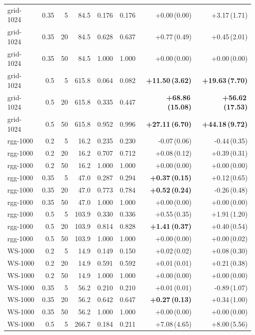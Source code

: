 \documentclass[11pt]{article}
\theoremstyle{definition}
\theoremstyle{remark}
\begin{document}
\begin{table}[h]
\begin{tabular}{lrrrrrrr}
grid-1024 & 0.35 & 5 & 84.5 & 0.176 & 0.176 & +0.00\,(0.00) & +3.17\,(1.71) \\
grid-1024 & 0.35 & 20 & 84.5 & 0.628 & 0.637 & +0.77\,(0.49) & +0.45\,(2.01) \\
grid-1024 & 0.35 & 50 & 84.5 & 1.000 & 1.000 & +0.00\,(0.00) & +0.00\,(0.00) \\
grid-1024 & 0.5 & 5 & 615.8 & 0.064 & 0.082 & \textbf{+11.50\,(3.62)} & \textbf{+19.63\,(7.70)} \\
grid-1024 & 0.5 & 20 & 615.8 & 0.335 & 0.447 & \textbf{+68.86\,(15.08)} & \textbf{+56.62\,(17.53)} \\
grid-1024 & 0.5 & 50 & 615.8 & 0.952 & 0.996 & \textbf{+27.11\,(6.70)} & \textbf{+44.18\,(9.72)} \\
rgg-1000 & 0.2 & 5 & 16.2 & 0.235 & 0.230 & -0.07\,(0.06) & -0.44\,(0.35) \\
rgg-1000 & 0.2 & 20 & 16.2 & 0.707 & 0.712 & +0.08\,(0.12) & +0.39\,(0.31) \\
rgg-1000 & 0.2 & 50 & 16.2 & 1.000 & 1.000 & +0.00\,(0.00) & +0.00\,(0.00) \\
rgg-1000 & 0.35 & 5 & 47.0 & 0.287 & 0.294 & \textbf{+0.37\,(0.15)} & +0.12\,(0.65) \\
rgg-1000 & 0.35 & 20 & 47.0 & 0.773 & 0.784 & \textbf{+0.52\,(0.24)} & -0.26\,(0.48) \\
rgg-1000 & 0.35 & 50 & 47.0 & 1.000 & 1.000 & +0.00\,(0.00) & +0.00\,(0.00) \\
rgg-1000 & 0.5 & 5 & 103.9 & 0.330 & 0.336 & +0.55\,(0.35) & +1.91\,(1.20) \\
rgg-1000 & 0.5 & 20 & 103.9 & 0.814 & 0.828 & \textbf{+1.41\,(0.37)} & +0.40\,(0.54) \\
rgg-1000 & 0.5 & 50 & 103.9 & 1.000 & 1.000 & +0.00\,(0.00) & +0.00\,(0.02) \\
WS-1000 & 0.2 & 5 & 14.9 & 0.149 & 0.150 & +0.02\,(0.02) & +0.08\,(0.30) \\
WS-1000 & 0.2 & 20 & 14.9 & 0.591 & 0.592 & +0.01\,(0.01) & +0.21\,(0.38) \\
WS-1000 & 0.2 & 50 & 14.9 & 1.000 & 1.000 & +0.00\,(0.00) & +0.00\,(0.00) \\
WS-1000 & 0.35 & 5 & 56.2 & 0.210 & 0.210 & +0.01\,(0.01) & -0.89\,(1.07) \\
WS-1000 & 0.35 & 20 & 56.2 & 0.642 & 0.647 & \textbf{+0.27\,(0.13)} & +0.34\,(1.00) \\
WS-1000 & 0.35 & 50 & 56.2 & 1.000 & 1.000 & +0.00\,(0.00) & +0.00\,(0.00) \\
WS-1000 & 0.5 & 5 & 266.7 & 0.184 & 0.211 & +7.08\,(4.65) & +8.00\,(5.56) \\

\end{tabular}
\end{table}
\end{document}
